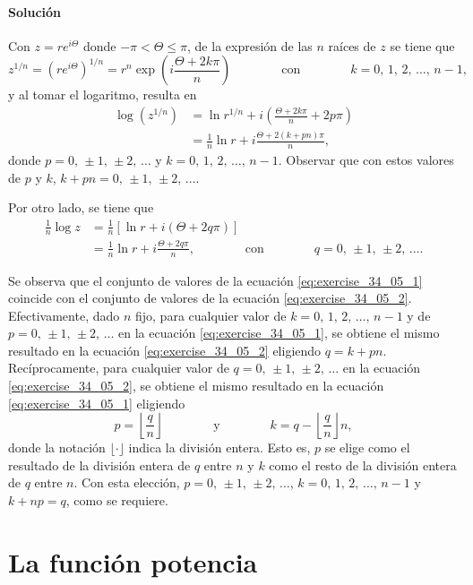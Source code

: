 \documentclass[a4paper]{report}
\begin{document}
\paragraph{Solución} Con \(z=re^{i\Theta}\) donde \(-\pi<\Theta\leq\pi\), de la expresión de las \(n\) raíces de \(z\) se tiene que
\[
 z^{1/n}=\left(re^{i\Theta}\right)^{1/n}=r^n\exp\left(i\frac{\Theta+2k\pi}{n}\right)
 \qquad\qquad\textrm{con}\qquad\qquad
 k=0,\,1,\,2,\,\dots,\,n-1,
\]
y al tomar el logaritmo, resulta en
\begin{align}
 \log(z^{1/n})&=\ln r^{1/n}+i\left(\frac{\Theta+2k\pi}{n}+2p\pi\right)\nonumber\\
  &=\frac{1}{n}\ln r+i\frac{\Theta+2(k+pn)\pi}{n},\label{eq:exercise_34_05_1}
\end{align}
donde \(p=0,\,\pm1,\,\pm2,\,\dots\) y \(k=0,\,1,\,2,\,\dots,\,n-1\). Observar que con estos valores de \(p\) y \(k\), \(k+pn=0,\,\pm1,\,\pm2,\,\dots\).

Por otro lado, se tiene que 
\begin{align}
 \frac{1}{n}\log z&=\frac{1}{n}\left[\ln r+i(\Theta+2q\pi)\right]\nonumber\\
  &=\frac{1}{n}\ln r+i\frac{\Theta+2q\pi}{n},
  \qquad\qquad\textrm{con}\qquad\qquad
  q=0,\,\pm1,\,\pm2,\,\dots.\label{eq:exercise_34_05_2}
\end{align}

Se observa que el conjunto de valores de la ecuación \ref{eq:exercise_34_05_1} coincide con el conjunto de valores de la ecuación \ref{eq:exercise_34_05_2}. Efectivamente, dado \(n\) fijo, para cualquier valor de \(k=0,\,1,\,2,\,\dots,\,n-1\) y de \(p=0,\,\pm1,\,\pm2,\,\dots\) en la ecuación \ref{eq:exercise_34_05_1}, se obtiene el mismo resultado en la ecuación \ref{eq:exercise_34_05_2} eligiendo \(q=k+pn\). Recíprocamente, para cualquier valor de \(q=0,\,\pm1,\,\pm2,\,\dots\) en la ecuación \ref{eq:exercise_34_05_2}, se obtiene el mismo resultado en la ecuación \ref{eq:exercise_34_05_1} eligiendo 
\[
 p=\left\lfloor\frac{q}{n}\right\rfloor
 \qquad\qquad\textrm{y}\qquad\qquad
 k=q-\left\lfloor\frac{q}{n}\right\rfloor n,
\]
donde la notación \(\lfloor\cdot\rfloor\) indica la división entera. Esto es, \(p\) se elige como el resultado de la división entera de \(q\) entre \(n\) y \(k\) como el resto de la división entera de \(q\) entre \(n\). Con esta elección, \(p=0,\,\pm1,\,\pm2,\,\dots\), \(k=0,\,1,\,2,\,\dots,\,n-1\) y \(k+np=q\), como se requiere.

\section{La función potencia}\label{sec:power_function}
\end{document}
